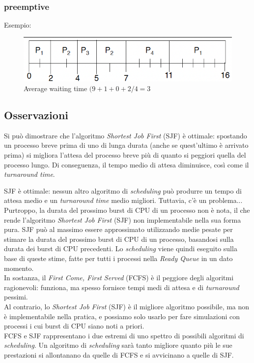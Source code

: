 \subsubsection{preemptive}
Esempio:
\begin{figure}[ht]
    \centering
    \includegraphics[width=0.2\linewidth]{images/SJF_preemptive.png}
    \caption{Average waiting time $(9 + 1 + 0 + 2/4 = 3$}
\end{figure}


\subsection{Osservazioni}
Si può dimostrare che l'algoritmo \textit{Shortest Job First} (SJF) è ottimale: spostando un processo breve prima di uno di lunga durata (anche se quest’ultimo è arrivato prima) si migliora l'attesa del processo breve più di quanto si peggiori quella del processo lungo. Di conseguenza, il tempo medio di attesa diminuisce, così come il \textit{turnaround time}.

SJF è ottimale: nessun altro algoritmo di \textit{scheduling} può produrre un tempo di attesa medio e un \textit{turnaround time} medio migliori. Tuttavia, c'è un problema...\\
Purtroppo, la durata del prossimo burst di CPU di un processo non è nota, il che rende l'algoritmo \textit{Shortest Job First} (SJF) non implementabile nella sua forma pura. SJF può al massimo essere approssimato utilizzando medie pesate per stimare la durata del prossimo burst di CPU di un processo, basandosi sulla durata dei burst di CPU precedenti.
Lo \textit{scheduling} viene quindi eseguito sulla base di queste stime, fatte per tutti i processi nella \textit{Ready Queue} in un dato momento.\\
In sostanza, il \textit{First Come, First Served} (FCFS) è il peggiore degli algoritmi ragionevoli: funziona, ma spesso fornisce tempi medi di attesa e di \textit{turnaround} pessimi.\\

Al contrario, lo \textit{Shortest Job First} (SJF) è il migliore algoritmo possibile, ma non è implementabile nella pratica, e possiamo solo usarlo per fare simulazioni con processi i cui burst di CPU siano noti a priori.\\

FCFS e SJF rappresentano i due estremi di uno spettro di possibili algoritmi di \textit{scheduling}. Un algoritmo di \textit{scheduling} sarà tanto migliore quanto più le sue prestazioni si allontanano da quelle di FCFS e si avvicinano a quelle di SJF.

